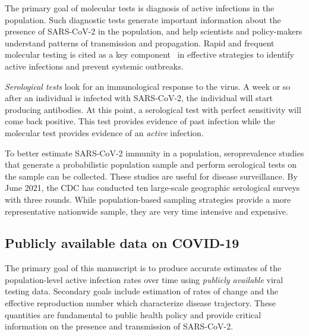 \documentclass[11pt]{amsart}
\numberwithin{equation}{section}
\theoremstyle{plain}
\begin{document}
 The primary goal of molecular tests is diagnosis of active infections in the population.  Such diagnostic tests generate important information about the presence of SARS-CoV-2 in the population, and help scientists and policy-makers understand patterns of transmission and propagation. Rapid and frequent molecular testing is cited as a key component~\citep{OECD2021} in effective strategies to identify active infections and prevent systemic outbreaks.


\emph{Serological tests} look for an immunological response to the virus.  A week or so after an individual is infected with SARS-CoV-2, the individual will start producing antibodies.  At this point, a serological test with perfect sensitivity will come back positive.  This test provides evidence of past infection while the molecular test provides evidence of an \emph{active} infection.

To better estimate SARS-CoV-2 immunity in a population, seroprevalence studies that generate a probabilistic population sample and perform serological tests on the sample can be collected.  These studies are useful for disease surveillance. By June 2021, the CDC has conducted ten large-scale geographic serological surveys with three rounds.  While population-based sampling strategies provide a more representative nationwide sample, they are very time intensive and expensive.

 \subsection{Publicly available data on COVID-19}
 \label{subsection:testinginfo}

 The primary goal of this manuscript is to produce accurate estimates of the population-level active infection rates over time using \emph{publicly available} viral testing data.  Secondary goals include estimation of rates of change and the effective reproduction number which characterize disease trajectory.
 These quantities are fundamental to public health policy and provide critical information on the presence and transmission of SARS-CoV-2.

\end{document}
